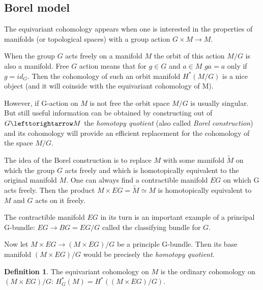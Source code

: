 \documentclass[11pt]{report}
\def\acts{\lefttorightarrow}
\theoremstyle{plain}
\theoremstyle{definition}
\newtheorem{defn}[thm]{Definition}
\theoremstyle{remark}
\theoremstyle{remark}
\numberwithin{equation}{section}
\begin{document}
\subsection{Borel model}

The equivariant cohomology appears when one is interested in the properties of manifolds (or topological spaces) with a group action $G\times M\to M$. 

When the group $G$ acts freely on a manifold $M$ the orbit of this action $M/G$ is also a manifold. Free $G$ action means that for $g\in G$  and $a\in M$ $ga = a$ only if $g=id_G$. Then the cohomology of such an orbit manifold $H^*(M/G)$ is a nice object (and it will coinside with the equivariant cohomology of M). 

However, if G-action on $M$ is not free the orbit space $M/G$ is usually singular. But still useful information can be obtained by constructing out of  $G\acts M$ the \textit{homotopy quotient} (also called \textit{Borel construction}) and its cohomology will provide an efficient replacement for the cohomology of the space $M/G$. 

The idea of the Borel construction is to replace $M$ with some manifold $\tilde{M}$ on which the group $G$ acts freely and which is homotopically equivalent to the original manifold $M$. 
One can always find a contractible manifold $EG$ on which G acts freely. Then the product $M\times EG=\tilde{M} \simeq M$ is homotopically equivalent to $M$ and $G$ acts on it freely.

The contractible manifold $EG$ in its turn is an important example of a principal G-bundle: $EG\to BG=EG/G$ called the classifying bundle for $G$. 


Now let $M \times EG \to (M \times EG)/G$ be a principle G-bundle. Then its base manifold $(M \times EG)/G$ would be precisely  the \textit{homotopy quotient}. 

 \begin{defn}
The equivariant cohomology on $M$ is the ordinary cohomology on $(M\times EG)/G$:
$H^*_G(M) = H^*((M\times EG)/G)$.
\end{defn}
\end{document}

